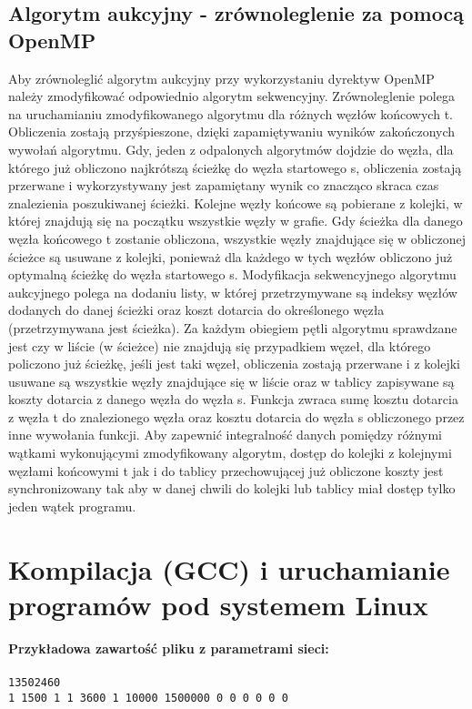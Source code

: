 \documentclass[12pt,a4paper]{article}
\begin{document}
\subsection{Algorytm aukcyjny - zrównoleglenie za pomocą OpenMP}
Aby zrównoleglić algorytm aukcyjny przy wykorzystaniu dyrektyw OpenMP należy zmodyfikować odpowiednio algorytm sekwencyjny. Zrównoleglenie polega na uruchamianiu zmodyfikowanego algorytmu dla różnych węzłów końcowych t. Obliczenia zostają przyśpieszone, dzięki zapamiętywaniu wyników zakończonych wywołań algorytmu. Gdy, jeden z odpalonych algorytmów dojdzie do węzła, dla którego już obliczono najkrótszą ścieżkę do węzła startowego s, obliczenia zostają przerwane i wykorzystywany jest zapamiętany wynik co znacząco skraca czas znalezienia poszukiwanej ścieżki. Kolejne węzły końcowe są pobierane z kolejki, w której znajdują się na początku wszystkie węzły w grafie. Gdy ścieżka dla danego węzła końcowego t zostanie obliczona, wszystkie węzły znajdujące się w obliczonej ścieżce są usuwane z kolejki, ponieważ dla każdego w tych węzłów  obliczono już optymalną ścieżkę do węzła startowego s. Modyfikacja sekwencyjnego algorytmu aukcyjnego polega na dodaniu listy, w której przetrzymywane są indeksy węzłów dodanych do danej ścieżki oraz koszt dotarcia do określonego węzła (przetrzymywana jest ścieżka). Za każdym obiegiem pętli algorytmu sprawdzane jest czy w liście (w ścieżce) nie znajdują się przypadkiem węzeł, dla którego policzono już ścieżkę, jeśli jest taki węzeł, obliczenia zostają przerwane i z kolejki usuwane są wszystkie węzły znajdujące się w liście oraz w tablicy zapisywane są koszty dotarcia z danego węzła do węzła s. Funkcja zwraca sumę kosztu dotarcia z węzła t do znalezionego węzła oraz kosztu dotarcia do węzła s obliczonego przez inne wywołania funkcji. Aby zapewnić integralność danych pomiędzy różnymi wątkami wykonującymi zmodyfikowany algorytm, dostęp do kolejki z kolejnymi węzłami końcowymi t jak i do tablicy przechowującej już obliczone koszty jest synchronizowany tak aby w danej chwili do kolejki lub tablicy miał dostęp tylko jeden wątek programu.
\section{Kompilacja (GCC) i uruchamianie programów pod systemem Linux}
\textbf{Przykładowa zawartość pliku z parametrami sieci:}\\\\
\texttt{13502460\\
1 1500 1 1 3600 1 10000 1500000 0 0 0 0 0 0}\\
\end{document}
